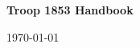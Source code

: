 \documentclass{ltxguide}
\begin{document}
\begin{titlepage}
    \centering
    \vfill
    {\bfseries\Huge
        Troop 1853 Handbook\\
    }    
    \vfill
	\begin{figure}
	\hfill
    \vfill
	\end{figure}
	\today
\end{titlepage}
\newpage
\end{document}

